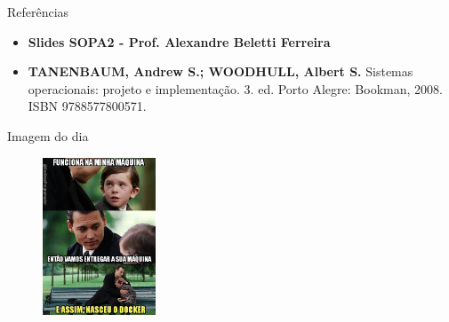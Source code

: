 \documentclass{beamer}
\begin{document}
\begin{frame}{Referências }\justifying
    \begin{itemize}
        \item \textbf{Slides SOPA2 - Prof. Alexandre Beletti Ferreira}
        \item \textbf{TANENBAUM, Andrew S.; WOODHULL, Albert S.} Sistemas operacionais: projeto e implementação. 3. ed. Porto Alegre: Bookman, 2008. ISBN 9788577800571.
    \end{itemize}
\end{frame}


\begin{frame}[fragile]{Imagem do dia}

    \begin{figure}[H]
        \centerline{\includegraphics[width=0.3\textwidth]{assets/imagem-do-dia/docker-meme.jpeg}}

    \end{figure}
\end{frame}

\backmatter
\end{document}
